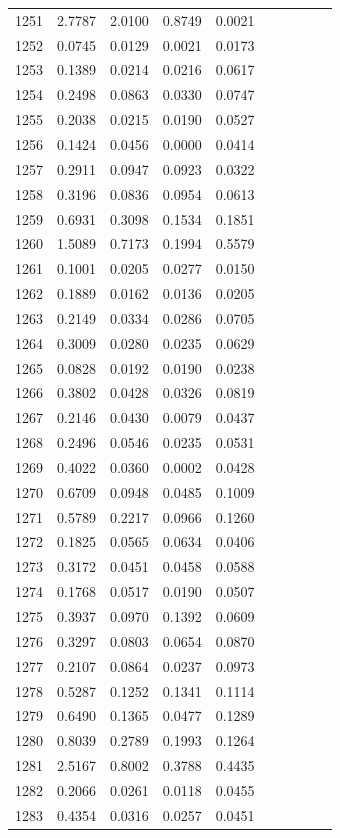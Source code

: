 \begin{table}
\begin{tabular}{cccccccccc}
1251& 2.7787& 2.0100& 0.8749& 0.0021\\ 
1252& 0.0745& 0.0129& 0.0021& 0.0173\\ 
1253& 0.1389& 0.0214& 0.0216& 0.0617\\ 
1254& 0.2498& 0.0863& 0.0330& 0.0747\\ 
1255& 0.2038& 0.0215& 0.0190& 0.0527\\ 
1256& 0.1424& 0.0456& 0.0000& 0.0414\\ 
1257& 0.2911& 0.0947& 0.0923& 0.0322\\ 
1258& 0.3196& 0.0836& 0.0954& 0.0613\\ 
1259& 0.6931& 0.3098& 0.1534& 0.1851\\ 
1260& 1.5089& 0.7173& 0.1994& 0.5579\\ 
1261& 0.1001& 0.0205& 0.0277& 0.0150\\ 
1262& 0.1889& 0.0162& 0.0136& 0.0205\\ 
1263& 0.2149& 0.0334& 0.0286& 0.0705\\ 
1264& 0.3009& 0.0280& 0.0235& 0.0629\\ 
1265& 0.0828& 0.0192& 0.0190& 0.0238\\ 
1266& 0.3802& 0.0428& 0.0326& 0.0819\\ 
1267& 0.2146& 0.0430& 0.0079& 0.0437\\ 
1268& 0.2496& 0.0546& 0.0235& 0.0531\\ 
1269& 0.4022& 0.0360& 0.0002& 0.0428\\ 
1270& 0.6709& 0.0948& 0.0485& 0.1009\\ 
1271& 0.5789& 0.2217& 0.0966& 0.1260\\ 
1272& 0.1825& 0.0565& 0.0634& 0.0406\\ 
1273& 0.3172& 0.0451& 0.0458& 0.0588\\ 
1274& 0.1768& 0.0517& 0.0190& 0.0507\\ 
1275& 0.3937& 0.0970& 0.1392& 0.0609\\ 
1276& 0.3297& 0.0803& 0.0654& 0.0870\\ 
1277& 0.2107& 0.0864& 0.0237& 0.0973\\ 
1278& 0.5287& 0.1252& 0.1341& 0.1114\\ 
1279& 0.6490& 0.1365& 0.0477& 0.1289\\ 
1280& 0.8039& 0.2789& 0.1993& 0.1264\\ 
1281& 2.5167& 0.8002& 0.3788& 0.4435\\ 
1282& 0.2066& 0.0261& 0.0118& 0.0455\\ 
1283& 0.4354& 0.0316& 0.0257& 0.0451\\ 

\end{tabular}
\end{table}

